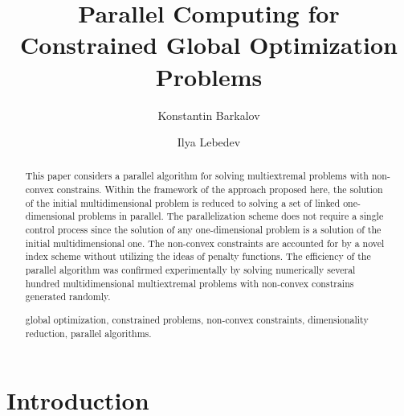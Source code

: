 \documentclass{llncs}
\begin{document}
\mainmatter 

\title{Parallel Computing for Constrained Global Optimization Problems}



\author{Konstantin Barkalov \Letter \and
        Ilya Lebedev %
\\
}



\maketitle

\begin{abstract}
This paper considers a parallel algorithm for solving multiextremal problems with non-convex 
constrains. Within the framework of the approach proposed here, the solution of the initial 
multidimensional problem is reduced to solving a set of linked one-dimensional problems in 
parallel. The parallelization scheme does not require a single control process since the solution of 
any one-dimensional problem is a solution of the initial multidimensional one. The non-convex 
constraints are accounted for by a novel index scheme without utilizing the ideas of penalty 
functions. The efficiency of the parallel algorithm was confirmed experimentally by solving 
numerically several hundred multidimensional multiextremal problems with non-convex 
constrains generated randomly.

\keywords global optimization, constrained problems, non-convex constraints, 
dimensionality reduction, parallel algorithms.

\end{abstract}

\section{Introduction}\label{intro}
\end{document}
